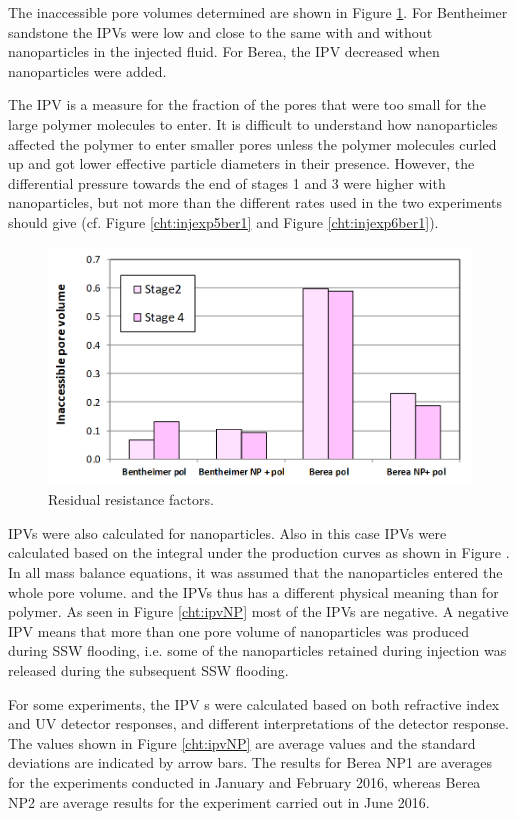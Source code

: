 The inaccessible pore volumes determined are shown in Figure \ref{cht:ipvPol}. For Bentheimer sandstone the IPVs were low and close to the same with and without nanoparticles in the injected fluid. For Berea, the IPV decreased when nanoparticles were added. 

The IPV is a measure for the fraction of the pores that were too small for the large polymer molecules to enter. It is difficult to understand how nanoparticles affected the polymer to enter smaller pores unless the polymer molecules curled up and got lower effective particle diameters in their presence. However, the differential pressure towards the end of stages 1 and 3 were higher with nanoparticles, but not more than the different rates used in the two experiments should give (cf. Figure \ref{cht:injexp5ber1} and Figure \ref{cht:injexp6ber1}). 

\begin{figure}[p]
    \centering
    \includegraphics[width=\textwidth]{img/cht/ipvPol.png}
    \caption{Residual resistance factors.}
    \label{cht:ipvPol}
\end{figure}

IPVs were also calculated for nanoparticles. Also in this case IPVs were calculated based on the integral under the production curves as shown in Figure \what [5.2]. In all mass balance equations, it was assumed that the nanoparticles entered the whole pore volume. and the IPVs thus has a different physical meaning than for polymer. As seen in Figure \ref{cht:ipvNP} most of the IPVs are negative. A negative IPV means that more than one pore volume of nanoparticles was produced during SSW flooding, i.e. some of the nanoparticles retained during injection was released during the subsequent SSW flooding.

For some experiments, the IPV s were calculated based on both refractive index and UV detector responses, and different interpretations of the detector response. The values shown in Figure \ref{cht:ipvNP} are average values and the standard deviations are indicated by arrow bars. The results for Berea NP1 are averages for the experiments conducted in January and February 2016, whereas Berea NP2 are average results for the experiment carried out in June 2016.

